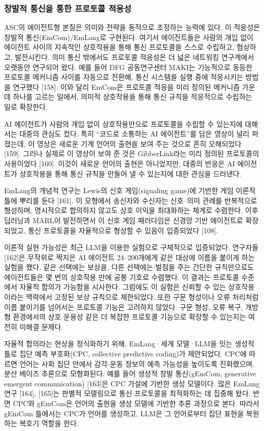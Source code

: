 \subsubsection{창발적 통신을 통한 프로토콜 적응성}
ASC의 에이전트형 본질은 의미와 전략을 동적으로 조정하는 능력에 있다. 이 적응성은 창발적 통신(EmCom)/EmLang로 구현된다. 여기서 에이전트들은 사람의 개입 없이 에이전트 사이의 지속적인 상호작용을 통해 통신 프로토콜을 스스로 수립하고, 협상하고, 발전시킨다. 의미 통신 밖에서도 프로토콜 적응성은 더 넓은 네트워킹 연구계에서 오랫동안 연구되어 왔다. 예를 들어 DFG 공동연구센터 MAKI는 기능적으로 동등한 프로토콜 메커니즘 사이를 자동으로 전환해, 통신 시스템을 실행 중에 적응시키는 방법을 연구했다 [158]. 이와 달리 EmCom은 프로토콜 적응을 미리 정의된 메커니즘 가운데 하나를 고르는 일에서, 의미적 상호작용을 통해 통신 규칙을 적응적으로 수립하는 일로 확장한다.

AI 에이전트가 사람의 개입 없이 상호작용만으로 프로토콜을 수립할 수 있는지에 대해서는 대중의 관심도 컸다. 특히 ``코드로 소통하는 AI 에이전트''를 담은 영상이 널리 퍼졌는데, 이 영상은 새로운 기계 언어의 출현을 보여 주는 것으로 흔히 오해되었다 [159]. 그러나 실제로 이 영상이 보여 준 것은 GibberLink라는 미리 정의된 프로토콜의 사용이었다 [160]. 이것이 새로운 언어의 출현은 아니었지만, 대중의 반응은 AI 에이전트가 상호작용을 통해 통신 규칙을 만들어 낼 수 있는지에 대한 관심을 드러낸다.

EmLang의 개념적 연구는 Lewis의 신호 게임(signaling game)에 기반한 게임 이론적 틀에 뿌리를 둔다 [161]. 이 모형에서 송신자와 수신자는 신호--의미 관례를 반복적으로 형성하며, 명시적으로 합의하지 않고도 상호 이익을 최대화하는 체계로 수렴한다. 이후 딥러닝과 MARL이 발전하면서 이 신호 게임 패러다임은 신경망 기반 에이전트로 확장되었고, 통신 프로토콜을 자율적으로 형성할 수 있음이 입증되었다 [108].

이론적 실현 가능성은 최근 LLM을 이용한 실험으로 구체적으로 입증되었다. 연구자들 [162]은 무작위로 짝지은 AI 에이전트 24--200개에게 같은 대상에 이름을 붙이게 하는 실험을 했다. 같은 선택에는 보상을, 다른 선택에는 벌점을 주는 간단한 규칙만으로도 에이전트들은 몇 번의 상호작용 만에 공통 기호로 수렴했다. 이 결과는 프로토콜 수준에서 자율적 합의가 가능함을 시사한다. 그럼에도 이 실험은 신뢰할 수 있는 상호작용이라는 맥락에서 고정된 보상 규칙으로 제한되었다. 또한 구문 형성이나 오류 처리처럼 이름 붙이기를 넘어서는 프로토콜 기능은 고려하지 않았다. 구문 형성, 오류 복구, 개방형 환경에서의 상호 운용성 같은 더 복잡한 프로토콜 기능으로 확장할 수 있는지는 여전히 미해결 문제다.

자율적 합의라는 현상을 정식화하기 위해, EmLang·세계 모델·LLM을 잇는 생성적 틀로 집단 예측 부호화(CPC, collective predictive coding)가 제안되었다. CPC에 따르면 언어는 사회 집단 안에서 감각-운동 정보의 예측 가능성을 높이도록 진화했으며, 분산 베이즈 추론으로 모형화된다. 예를 들어 생성적 창발 통신(gEmCom, generative emergent communication) [163]은 CPC 가설에 기반한 생성 모델이다. 많은 EmLang 연구 [164], [165]는 판별적 모델링으로 통신 프로토콜을 최적화하는 데 집중해 왔다. 반면 CPC와 gEmCom은 언어의 출현을 생성 모델에 기반한 추론 과정으로 본다. 따라서 gEmCom 틀에서는 CPC가 언어를 생성하고, LLM은 그 언어로부터 집단 표현을 복원하는 복호기 역할을 한다.

